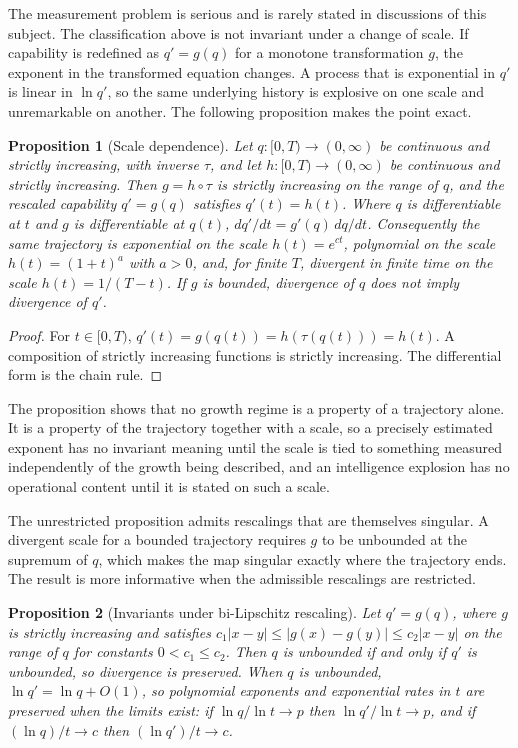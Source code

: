 \documentclass[11pt]{article}
\newtheorem{proposition}{Proposition}
\begin{document}
The measurement problem is serious and is rarely stated in discussions of this subject. The classification above is not invariant under a change of scale. If capability is redefined as $q'=g(q)$ for a monotone transformation $g$, the exponent in the transformed equation changes. A process that is exponential in $q'$ is linear in $\ln q'$, so the same underlying history is explosive on one scale and unremarkable on another. The following proposition makes the point exact.

\begin{proposition}[Scale dependence]
Let $q:[0,T)\to(0,\infty)$ be continuous and strictly increasing, with inverse $\tau$, and let $h:[0,T)\to(0,\infty)$ be continuous and strictly increasing. Then $g=h\circ\tau$ is strictly increasing on the range of $q$, and the rescaled capability $q'=g(q)$ satisfies $q'(t)=h(t)$. Where $q$ is differentiable at $t$ and $g$ is differentiable at $q(t)$, $dq'/dt=g'(q)\,dq/dt$. Consequently the same trajectory is exponential on the scale $h(t)=e^{ct}$, polynomial on the scale $h(t)=(1+t)^{a}$ with $a>0$, and, for finite $T$, divergent in finite time on the scale $h(t)=1/(T-t)$. If $g$ is bounded, divergence of $q$ does not imply divergence of $q'$.
\end{proposition}

\begin{proof}
For $t\in[0,T)$, $q'(t)=g(q(t))=h(\tau(q(t)))=h(t)$. A composition of strictly increasing functions is strictly increasing. The differential form is the chain rule. \qedhere
\end{proof}

The proposition shows that no growth regime is a property of a trajectory alone. It is a property of the trajectory together with a scale, so a precisely estimated exponent has no invariant meaning until the scale is tied to something measured independently of the growth being described, and an intelligence explosion has no operational content until it is stated on such a scale.

The unrestricted proposition admits rescalings that are themselves singular. A divergent scale for a bounded trajectory requires $g$ to be unbounded at the supremum of $q$, which makes the map singular exactly where the trajectory ends. The result is more informative when the admissible rescalings are restricted.

\begin{proposition}[Invariants under bi-Lipschitz rescaling]
Let $q'=g(q)$, where $g$ is strictly increasing and satisfies $c_1|x-y|\le|g(x)-g(y)|\le c_2|x-y|$ on the range of $q$ for constants $0<c_1\le c_2$. Then $q$ is unbounded if and only if $q'$ is unbounded, so divergence is preserved. When $q$ is unbounded, $\ln q'=\ln q+O(1)$, so polynomial exponents and exponential rates in $t$ are preserved when the limits exist: if $\ln q/\ln t\to p$ then $\ln q'/\ln t\to p$, and if $(\ln q)/t\to c$ then $(\ln q')/t\to c$.
\end{proposition}
\end{document}
